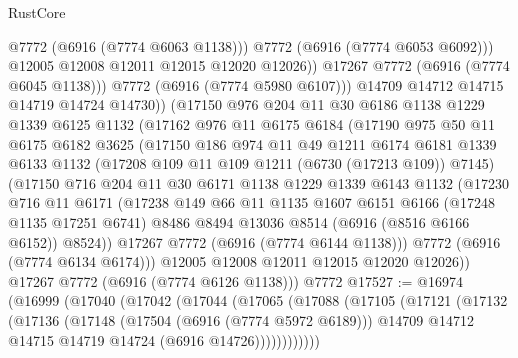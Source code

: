 \begin{lexlean}{RustCore}
\begin{coremodule}
                    @7772
                    (@6916 (@7774 @6063 @1138)))
                  @7772
                  (@6916 (@7774 @6053 @6092)))
                @12005
                @12008
                @12011
                @12015
                @12020
                @12026))
            @17267
            @7772
            (@6916 (@7774 @6045 @1138)))
          @7772
          (@6916 (@7774 @5980 @6107)))
        @14709
        @14712
        @14715
        @14719
        @14724
        @14730))
    (@17150
      @976
      @204
      @11
      @30
      @6186
      @1138
      @1229
      @1339
      @6125
      @1132
      (@17162
        @976
        @11
        @6175
        @6184
        (@17190
          @975
          @50
          @11
          @6175
          @6182
          @3625
          (@17150
            @186
            @974
            @11
            @49
            @1211
            @6174
            @6181
            @1339
            @6133
            @1132
            (@17208 @109 @11 @109 @1211 (@6730 (@17213 @109)) @7145)
            (@17150
              @716
              @204
              @11
              @30
              @6171
              @1138
              @1229
              @1339
              @6143
              @1132
              (@17230
                @716
                @11
                @6171
                (@17238
                  @149
                  @66
                  @11
                  @1135
                  @1607
                  @6151
                  @6166
                  (@17248 @1135 @17251 @6741)
                  @8486
                  @8494
                  @13036
                  @8514
                  (@6916 (@8516 @6166 @6152))
                  @8524))
              @17267
              @7772
              (@6916 (@7774 @6144 @1138)))
            @7772
            (@6916 (@7774 @6134 @6174)))
          @12005
          @12008
          @12011
          @12015
          @12020
          @12026))
      @17267
      @7772
      (@6916 (@7774 @6126 @1138)))
    @7772
@17527 := @16974
    (@16999
      (@17040
        (@17042
          (@17044
            (@17065
              (@17088
                (@17105
                  (@17121
                    (@17132
                      (@17136
                        (@17148
                          (@17504 (@6916 (@7774 @5972 @6189)))
                          @14709
                          @14712
                          @14715
                          @14719
                          @14724
                          (@6916 @14726))))))))))))

\end{coremodule}
\end{lexlean}
